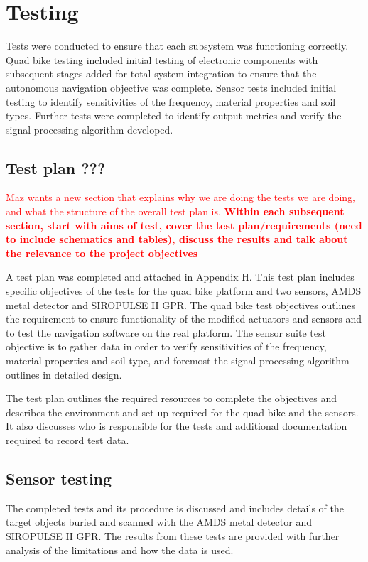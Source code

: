 \documentclass[main.tex]{subfiles}
\begin{document}
\chapter{Testing}
Tests were conducted to ensure that each subsystem was functioning correctly. Quad bike testing included initial testing of electronic components with subsequent stages added for total system integration to ensure that the autonomous navigation objective was complete. Sensor tests included initial testing to identify sensitivities of the frequency, material properties and soil types. Further tests were completed to identify output metrics and verify the signal processing algorithm developed. 

\section{Test plan ???}
\textcolor{red}{Maz wants a new section that explains why we are doing the tests we are doing, and what the structure of the overall test plan is. \textbf{Within each subsequent section, start with aims of test, cover the test plan/requirements (need to include schematics and tables), discuss the results and talk about the relevance to the project objectives}}


A test plan was completed and attached in Appendix H. This test plan includes specific objectives of the tests for the quad bike platform and two sensors, AMDS metal detector and SIROPULSE II GPR. The quad bike test objectives outlines the requirement to ensure functionality of the modified actuators and sensors and to test the navigation software on the real platform. The sensor suite test objective is to gather data in order to verify sensitivities of the frequency, material properties and soil type, and foremost the signal processing algorithm outlines in detailed design. 

The test plan outlines the required resources to complete the objectives and describes the environment and set-up required for the quad bike and the sensors. It also discusses who is responsible for the tests and additional documentation required to record test data. 

\section{Sensor testing}
The completed tests and its procedure is discussed and includes details of the target objects buried and scanned with the AMDS metal detector and SIROPULSE II GPR. The results from these tests are provided with further analysis of the limitations and how the data is used. 
\end{document}
